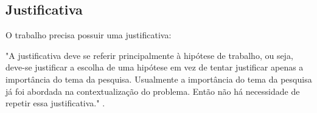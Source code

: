 \documentclass[12pt,a4paper,chapter=TITLE,section=TITLE,subsection=TITLE,subsubsection=TITLE]{article}
\begin{document}
\subsection{Justificativa}    

    O trabalho precisa possuir uma justificativa:
    \begin{citacao}
    "A justificativa deve se referir principalmente à hipótese de trabalho, ou seja, deve-se justificar a escolha de uma
    hipótese em vez de tentar justificar apenas a importância do tema da pesquisa. Usualmente a importância do
    tema da pesquisa já foi abordada na contextualização do problema. Então não há necessidade de repetir essa
    justificativa."
    \lipsum[5] \cite{PESQUISA:RAUL}.
    \end{citacao}
\end{document}
